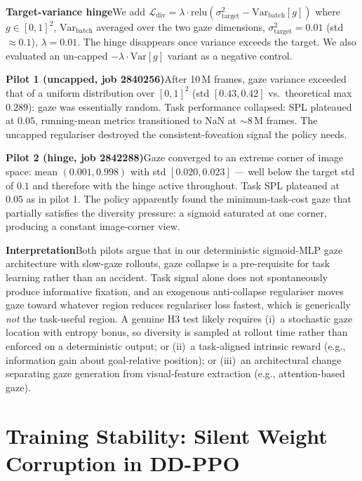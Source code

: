 \documentclass{article}
\begin{document}
\noindent\textbf{Target-variance hinge}\quad We add $\mathcal{L}_\text{div} = \lambda \cdot \text{relu}(\sigma^2_\text{target} - \text{Var}_\text{batch}[g])$ where $g \in [0,1]^2$, $\text{Var}_\text{batch}$ averaged over the two gaze dimensions, $\sigma^2_\text{target}=0.01$ (std $\approx 0.1$), $\lambda = 0.01$. The hinge disappears once variance exceeds the target. We also evaluated an un-capped $-\lambda\cdot\text{Var}[g]$ variant as a negative control.

\noindent\textbf{Pilot 1 (uncapped, job 2840256)}\quad After 10\,M frames, gaze variance exceeded that of a uniform distribution over $[0,1]^2$ (std $[0.43, 0.42]$ vs.\ theoretical max $0.289$): gaze was essentially random. Task performance collapsed: SPL plateaued at $0.05$, running-mean metrics transitioned to NaN at $\sim 8$\,M frames. The uncapped regulariser destroyed the consistent-foveation signal the policy needs.

\noindent\textbf{Pilot 2 (hinge, job 2842288)}\quad Gaze converged to an extreme corner of image space: mean $(0.001, 0.998)$ with std $[0.020, 0.023]$ --- well below the target std of $0.1$ and therefore with the hinge active throughout. Task SPL plateaued at $0.05$ as in pilot 1. The policy apparently found the minimum-task-cost gaze that partially satisfies the diversity pressure: a sigmoid saturated at one corner, producing a constant image-corner view.

\noindent\textbf{Interpretation}\quad Both pilots argue that in our deterministic sigmoid-MLP gaze architecture with slow-gaze rollouts, gaze collapse is a pre-requisite for task learning rather than an accident. Task signal alone does not spontaneously produce informative fixation, and an exogenous anti-collapse regulariser moves gaze toward whatever region reduces regulariser loss fastest, which is generically \emph{not} the task-useful region. A genuine H3 test likely requires (i)~a stochastic gaze location with entropy bonus, so diversity is sampled at rollout time rather than enforced on a deterministic output; or (ii)~a task-aligned intrinsic reward (e.g., information gain about goal-relative position); or (iii)~an architectural change separating gaze generation from visual-feature extraction (e.g., attention-based gaze).


\section{Training Stability: Silent Weight Corruption in DD-PPO}
\label{app:training-stability}
\end{document}
